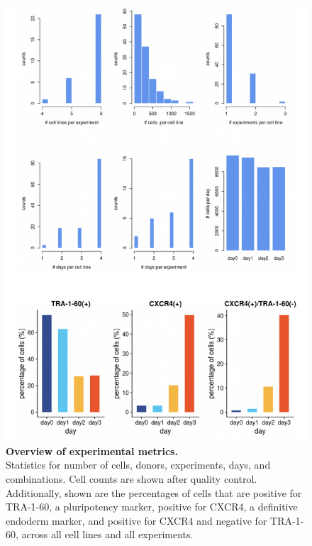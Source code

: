\begin{figure}[htbp]
\centering
\includegraphics[width=14cm]{Chapter4/Fig/endodiff_stats.png}
\caption[Overview of experimental metrics]{\textbf{Overview of experimental metrics.}\\
Statistics for number of cells, donors, experiments, days, and combinations. 
Cell counts are shown after quality control.
Additionally, shown are the percentages of cells that are positive for TRA-1-60, a pluripotency marker, positive for CXCR4, a definitive endoderm marker, and  positive for CXCR4 and negative for TRA-1-60, across all cell lines and all experiments.}
\label{fig:endodiff_stats}
\end{figure}


